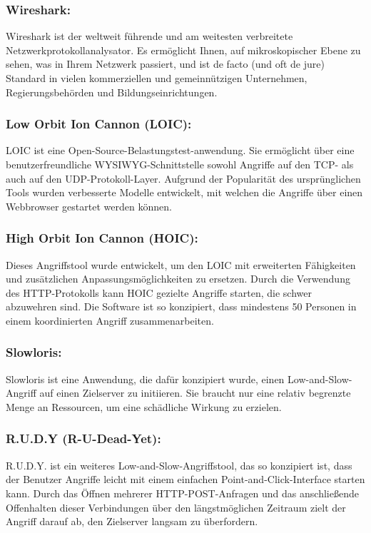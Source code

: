 \subsubsection{Wireshark:}
Wireshark ist der weltweit führende und am weitesten verbreitete Netzwerkprotokollanalysator. Es ermöglicht Ihnen, auf mikroskopischer Ebene zu sehen, was in Ihrem Netzwerk passiert, und ist de facto (und oft de jure) Standard in vielen kommerziellen und gemeinnützigen Unternehmen, Regierungsbehörden und Bildungseinrichtungen.\cite{ref_url8}\par

\subsubsection{Low Orbit Ion Cannon (LOIC):}
LOIC ist eine Open-Source-Belastungstest-anwendung. Sie ermöglicht über eine benutzerfreundliche WYSIWYG-Schnittstelle sowohl Angriffe auf den TCP- als auch auf den UDP-Protokoll-Layer. Aufgrund der Popularität des ursprünglichen Tools wurden verbesserte Modelle entwickelt, mit welchen die Angriffe über einen Webbrowser gestartet werden können.\cite{ref_url9}\par

\subsubsection{High Orbit Ion Cannon (HOIC):}
Dieses Angriffstool wurde entwickelt, um den LOIC mit erweiterten Fähigkeiten und zusätzlichen Anpassungsmöglichkeiten zu ersetzen. Durch die Verwendung des HTTP-Protokolls kann HOIC gezielte Angriffe starten, die schwer abzuwehren sind. Die Software ist so konzipiert, dass mindestens 50 Personen in einem koordinierten Angriff zusammenarbeiten.\cite{ref_url9}\par

\subsubsection{Slowloris:}
Slowloris ist eine Anwendung, die dafür konzipiert wurde, einen Low-and-Slow-Angriff auf einen Zielserver zu initiieren. Sie braucht nur eine relativ begrenzte Menge an Ressourcen, um eine schädliche Wirkung zu erzielen.\cite{ref_url9}\par

\subsubsection{R.U.D.Y (R-U-Dead-Yet):}
R.U.D.Y. ist ein weiteres Low-and-Slow-Angriffstool, das so konzipiert ist, dass der Benutzer Angriffe leicht mit einem einfachen Point-and-Click-Interface starten kann. Durch das Öffnen mehrerer HTTP-POST-Anfragen und das anschließende Offenhalten dieser Verbindungen über den längstmöglichen Zeitraum zielt der Angriff darauf ab, den Zielserver langsam zu überfordern.\cite{ref_url9}\par

